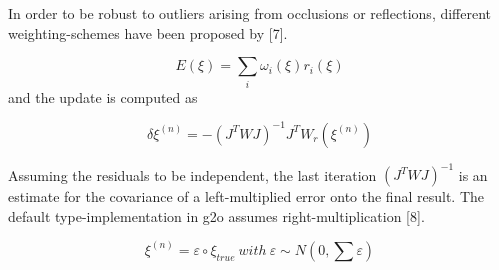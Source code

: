 In order to be robust to outliers arising from occlusions or reflections, different weighting-schemes have been proposed by [7].

\begin{equation}
E(\xi)=\sum\limits_i \omega_{i}(\xi)r_{i}(\xi)
\end{equation}
and the update is computed as

\begin{equation}
\delta {\xi ^{(n)}} =  - (J^{T}WJ)^{ - 1}J^{T}W_{r}({\xi ^{(n)}})
\end{equation}

Assuming the residuals to be independent, the last iteration ${({J^T}WJ)^{ - 1}}$ is an estimate for the covariance   of a left-multiplied error onto the final result. The default type-implementation in g2o assumes right-multiplication [8].

\begin{equation}
\xi ^{(n)} = \varepsilon  \circ \xi _{true} \ with \ \varepsilon \sim N(0,\sum \varepsilon  )
\end{equation}
\fi



